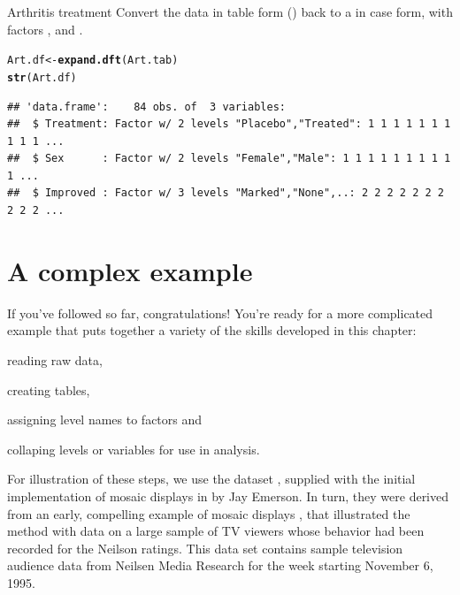 \documentclass[11pt]{book}\usepackage[]{graphicx}\usepackage[]{color}
\makeatletter
\newcommand{\hlstd}[1]{\textcolor[rgb]{0.345,0.345,0.345}{#1}}%
\newcommand{\hlkwb}[1]{\textcolor[rgb]{0.69,0.353,0.396}{#1}}%
\newcommand{\hlkwd}[1]{\textcolor[rgb]{0.737,0.353,0.396}{\textbf{#1}}}%
\newenvironment{kframe}{%
 \def\at@end@of@kframe{}%
 \ifinner\ifhmode%
  \def\at@end@of@kframe{\end{minipage}}%
  \begin{minipage}{\columnwidth}%
 \fi\fi%
 \def\FrameCommand##1{\hskip\@totalleftmargin \hskip-\fboxsep
 \colorbox{shadecolor}{##1}\hskip-\fboxsep
     \hskip-\linewidth \hskip-\@totalleftmargin \hskip\columnwidth}%
 \MakeFramed {\advance\hsize-\width
   \@totalleftmargin\z@ \linewidth\hsize
   \@setminipage}}%
 {\par\unskip\endMakeFramed%
 \at@end@of@kframe}
\newenvironment{knitrout}{}{} %
\renewenvironment{knitrout}{\small\renewcommand{\baselinestretch}{.85}}{} %
\makeatother
\begin{document}
\begin{Example}{Arthritis treatment}
Convert the  data in table form () back to a 
in case form, with factors
,  and .
\begin{knitrout}
\color{fgcolor}\begin{kframe}
\begin{alltt}
\hlstd{Art.df} \hlkwb{<-} \hlkwd{expand.dft}\hlstd{(Art.tab)}
\hlkwd{str}\hlstd{(Art.df)}
\end{alltt}
\begin{verbatim}
## 'data.frame':	84 obs. of  3 variables:
##  $ Treatment: Factor w/ 2 levels "Placebo","Treated": 1 1 1 1 1 1 1 1 1 1 ...
##  $ Sex      : Factor w/ 2 levels "Female","Male": 1 1 1 1 1 1 1 1 1 1 ...
##  $ Improved : Factor w/ 3 levels "Marked","None",..: 2 2 2 2 2 2 2 2 2 2 ...
\end{verbatim}
\end{kframe}
\end{knitrout}

\end{Example}


\section{A complex example}

If you've followed so far, congratulations! You're ready for a more complicated example
that puts together a variety of the skills developed in this chapter:
\begin{seriate}
  \item reading raw data, 
  \item creating tables, 
  \item assigning level names to factors and
  \item collaping levels or variables for use in analysis.
\end{seriate}

For illustration of these steps, 
we use the dataset , supplied with
the initial implementation of 
mosaic displays in \R by Jay Emerson. 
In turn, they were derived from an early, compelling example of mosaic displays 
\citep{HartiganKleiner:84},
that illustrated the method with data on a large sample of TV viewers
whose behavior had been recorded for the Neilson ratings.
This data set contains sample television audience data from Neilsen
Media Research for the week starting November 6, 1995.
\end{document}
